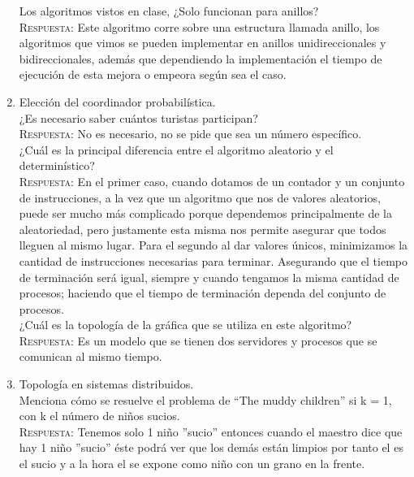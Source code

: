 \documentclass[letterpaper,10pt]{article}
\begin{document}
\begin{enumerate}
	Los algoritmos vistos en clase, ¿Solo funcionan para anillos?\\
    \textsc{Respuesta:}
    Este algoritmo corre sobre una estructura llamada anillo, los algoritmos que vimos se  pueden implementar en anillos unidireccionales y bidireccionales, además que dependiendo la implementación el tiempo de ejecución de esta mejora o empeora según sea el caso. \\
    
    \item Elección del coordinador probabilística. \\
	
	¿Es necesario saber cuántos turistas participan?\\
    \textsc{Respuesta:}
    No es necesario, no se pide que sea un número específico.  \\
    
    ¿Cuál es la principal diferencia entre el algoritmo aleatorio y el determinístico?\\
    \textsc{Respuesta:}
   En el primer caso, cuando dotamos de un contador y un conjunto de instrucciones, a la vez que un algoritmo que nos de valores aleatorios, puede ser mucho más complicado porque dependemos principalmente de la aleatoriedad, pero justamente esta misma nos permite asegurar que todos lleguen al mismo lugar.
Para el segundo al dar valores únicos, minimizamos la cantidad de instrucciones necesarias para terminar. Asegurando que el tiempo de terminación será  igual, siempre y cuando tengamos la misma cantidad de procesos; haciendo que el tiempo de terminación dependa del conjunto de procesos. \\
	
	¿Cuál es la topología de la gráfica que se utiliza en este algoritmo?\\
	\textsc{Respuesta:}
    Es un modelo que se tienen dos servidores y procesos que se comunican al mismo tiempo.\\	
	
    \item Topología en sistemas distribuidos.\\
    
	Menciona cómo se resuelve el problema de “The muddy children” si k = 1, con k el número de niños sucios.\\
    \textsc{Respuesta:}
    Tenemos solo 1 niño ”sucio” entonces cuando el maestro dice que hay 1 niño ”sucio” éste podrá ver que los demás están limpios por tanto el es el sucio y a la hora el se expone como niño con un grano en la frente. \\
    

\end{enumerate}
\end{document}

